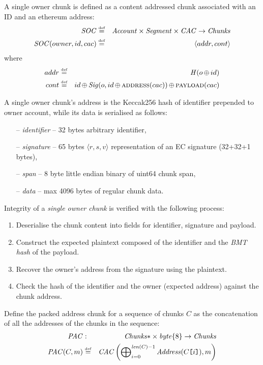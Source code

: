 \begin{definition}
\label{def:soc}
A single owner chunk  is defined as a content addressed chunk associated with an ID and an ethereum address: 
%
\begin{eqnarray}
\mathit{SOC} &\overset{\textrm{\tiny def}}{=}& \mathit{Account}\times\mathit{Segment}\times\mathit{CAC}\to\mathit{Chunks}\\
\mathit{SOC}(owner,id,cac)&\overset{\textrm{\tiny def}}{=}& \langle addr, cont\rangle
\end{eqnarray}
%
where
%
\begin{eqnarray}
addr&\overset{\textrm{\tiny def}}{=}& \mathit{H}(o\operatorname{\operatorname{\oplus}} id)\\
cont &\overset{\textrm{\tiny def}}{=}& id\operatorname{\operatorname{\oplus}}\mathit{Sig}(o, id\operatorname{\operatorname{\oplus}}\textsc{address}(cac))\operatorname{\operatorname{\oplus}} \textsc{payload}(cac)
\end{eqnarray}

A single owner chunk's address is the Keccak256 hash of identifier prepended to owner account, while its data is serialised as follows:
\begin{itemize}[noitemsep]
    \item[--] \emph{identifier} -- 32 bytes arbitrary identifier, 
    \item[--] \emph{signature} -- 65 bytes $\langle r,s,v \rangle$ representation of an EC signature (32+32+1 bytes),
    \item[--] \emph{span} -- 8 byte little endian binary of uint64 chunk span,
    \item[--] \emph{data} -- max 4096 bytes of regular chunk data.
\end{itemize}

Integrity of a \emph{single owner chunk} is verified with the following process:
\begin{enumerate}[noitemsep]
    \item Deserialise the chunk content into fields for identifier, signature and payload.
    \item Construct the expected plaintext composed of the identifier and the \emph{BMT hash} of the payload.
    \item Recover the owner's address from the signature using the plaintext.
    \item Check the hash of the identifier and the owner (expected address) against the chunk address.
\end{enumerate}

\end{definition}

\begin{definition}
\label{def:pac}
Define the packed address chunk for a sequence of chunks $C$ as the concatenation of all the addresses of the chunks in the sequence:
\begin{eqnarray}
\mathit{PAC}&:&\mathit{Chunks}{*}\times\mathit{byte}\{8\}\to\mathit{Chunks}\\
\mathit{PAC}(C,m)&\defeq&\mathit{CAC}\left(\Concat_{i=0}^{\mathit{len}(C)-1} \mathit{Address}(C\idx{i}), m\right)
\end{eqnarray}
\end{definition}

